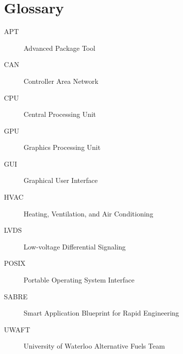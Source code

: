\documentclass[ece]{uw-wkrpt}
\begin{document}
\backmatter

%


\appendix

\section{Glossary}\label{app:glossary}
\begin{description}
  \item[APT] Advanced Package Tool
  \item[CAN] Controller Area Network
  \item[CPU] Central Processing Unit
  \item[GPU] Graphics Processing Unit
  \item[GUI] Graphical User Interface
  \item[HVAC] Heating, Ventilation, and Air Conditioning
  \item[LVDS] Low-voltage Differential Signaling
  \item[POSIX] Portable Operating System Interface
  \item[SABRE] Smart Application Blueprint for Rapid Engineering
  \item[UWAFT] University of Waterloo Alternative Fuels Team
\end{description}
\end{document}
